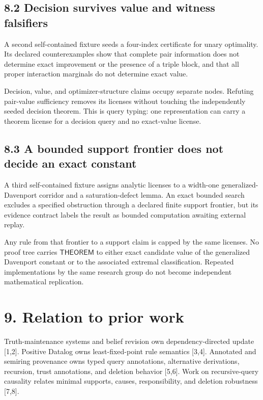 \documentclass[
  11pt,
]{article}
\begin{document}
\hypertarget{decision-survives-value-and-witness-falsifiers}{%
\subsection{8.2 Decision survives value and witness
falsifiers}\label{decision-survives-value-and-witness-falsifiers}}

A second self-contained fixture seeds a four-index certificate for unary
optimality. Its declared counterexamples show that complete pair
information does not determine exact improvement or the presence of a
triple block, and that all proper interaction marginals do not determine
exact value.

Decision, value, and optimizer-structure claims occupy separate nodes.
Refuting pair-value sufficiency removes its licenses without touching
the independently seeded decision theorem. This is query typing: one
representation can carry a theorem license for a decision query and no
exact-value license.

\hypertarget{a-bounded-support-frontier-does-not-decide-an-exact-constant}{%
\subsection{8.3 A bounded support frontier does not decide an exact
constant}\label{a-bounded-support-frontier-does-not-decide-an-exact-constant}}

A third self-contained fixture assigns analytic licenses to a width-one
generalized-Davenport corridor and a saturation-defect lemma. An exact
bounded search excludes a specified obstruction through a declared
finite support frontier, but its evidence contract labels the result as
bounded computation awaiting external replay.

Any rule from that frontier to a support claim is capped by the same
licenses. No proof tree carries \(\textsf{THEOREM}\) to either exact
candidate value of the generalized Davenport constant or to the
associated extremal classification. Repeated implementations by the same
research group do not become independent mathematical replication.

\hypertarget{relation-to-prior-work}{%
\section{9. Relation to prior work}\label{relation-to-prior-work}}

Truth-maintenance systems and belief revision own dependency-directed
update {[}1,2{]}. Positive Datalog owns least-fixed-point rule semantics
{[}3,4{]}. Annotated and semiring provenance owns typed query
annotations, alternative derivations, recursion, trust annotations, and
deletion behavior {[}5,6{]}. Work on recursive-query causality relates
minimal supports, causes, responsibility, and deletion robustness
{[}7,8{]}.
\end{document}
